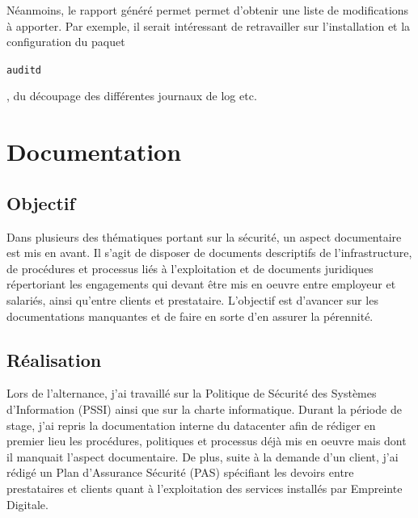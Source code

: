 \documentclass[12pt, a4paper, twoside]{article}
\begin{document}
Néanmoins, le rapport généré permet permet d'obtenir une liste de modifications à apporter.
Par exemple, il serait intéressant de retravailler sur l'installation et la configuration du paquet \begin{code}\texttt{auditd}\end{code}, du découpage des différentes journaux de log etc.

\newpage
\section{Documentation}
\subsection{Objectif}
Dans plusieurs des thématiques portant sur la sécurité, un aspect documentaire est mis en avant. 
Il s'agit de disposer de documents descriptifs de l'infrastructure, de procédures et processus liés à l'exploitation et de documents juridiques répertoriant les engagements qui devant être mis en oeuvre entre employeur et salariés, ainsi qu'entre clients et prestataire. 
L'objectif est d'avancer sur les documentations manquantes et de faire en sorte d'en assurer la pérennité.

\subsection{Réalisation}
Lors de l'alternance, j'ai travaillé sur la Politique de Sécurité des Systèmes d'Information (\gls{PSSI}) ainsi que sur la charte informatique. 
Durant la période de stage, j'ai repris la documentation interne du datacenter afin de rédiger en premier lieu les procédures, politiques et processus déjà mis en oeuvre mais dont il manquait l'aspect documentaire.
De plus, suite à la demande d'un client, j'ai rédigé un Plan d'Assurance Sécurité (\gls{PAS}) spécifiant les devoirs entre prestataires et clients quant à l'exploitation des services installés par Empreinte Digitale. \\
\end{document}
